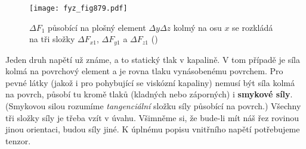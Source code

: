     \begin{figure}[ht!] %
      \centering
      \texttt{[image: fyz\_fig879.pdf]}
      \caption{\(\Delta F_1\) působící na plošný element \(\Delta y\Delta z\) kolmý na osu \(x\) se
              rozkládá na tři složky \(\Delta F_{x1}\), \(\Delta F_{y1}\) a \(\Delta F_{z1}\)
              (\cite[s.~584]{Feynman02})}
      \label{fyz:fig879}
    \end{figure}

    Jeden druh napětí už známe, a to statický tlak v kapalině. V tom případě je síla kolmá na
    povrchový element a je rovna tlaku vynásobenému povrchem. Pro pevné látky (jakož i pro
    pohybující se viskózní kapaliny) nemusí být síla kolmá na povrch, působí tu kromě tlaků
    (kladných nebo záporných) i \textbf{smykové síly}. (Smykovou silou rozumíme \emph{tangenciální}
    složku síly působící na povrch.) Všechny tři složky síly je třeba vzít v úvahu. Všimněme si, že
    bude-li mít náš řez rovinou jinou orientaci, budou síly jiné. K úplnému popisu vnitřního napětí
    potřebujeme tenzor.
    
